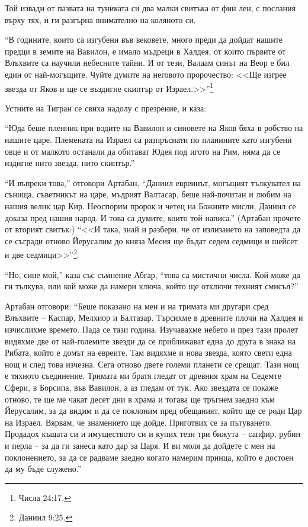 \documentclass[oneside,10pt]{memoir}
\begin{document}
Той извади от пазвата на туниката си два малки свитъка от фин лен, с послания
върху тях, и ги разгърна внимателно на коляното си.

``В годините, които са изгубени във вековете, много преди да дойдат нашите
предци в земите на Вавилон, е имало мъдреци в Халдея, от които първите от
Влъхвите са научили небесните тайни. И от тези, Валаам синът на Веор е бил един
от най-могъщите. Чуйте думите на неговото пророчество: <<Ще изгрее звезда от
Яков и ще се въздигне скиптър от Израел.>>''\footnote{Числа 24:17.}

Устните на Тигран се свиха надолу с презрение, и каза:

``Юда беше пленник при водите на Вавилон и синовете на Яков бяха в робство на
нашите царе. Племената на Израел са разпръснати по планините като изгубени овце
и от малкото останали да обитават Юдея под игото на Рим, няма да се издигне нито
звезда, нито скиптър.''

``И въпреки това,'' отговори Артабан, ``Даниил евреинът, могъщият тълкувател на
сънища, съветникът на царе, мъдрият Валтасар, беше най-почитан и любим на нашия
велик цар Кир. Неоспорим пророк и четец на Божиите мисли, Даниил се доказа пред
нашия народ. И това са думите, които той написа.'' (Артабан прочете от вторият
свитък:) ``<<И така, знай и разбери, че от излизането на заповедта да се съгради
отново Йерусалим до княза Месия ще бъдат седем седмици и шейсет и две
седмици>>''\footnote{Даниил 9:25.}.

``Но, сине мой,'' каза със съмнение Абгар, ``това са мистични числа. Кой може да
ги тълкува, или кой може да намери ключа, който ще отключи техният смисъл?''

Артабан отговори: ``Беше показано на мен и на тримата ми другари сред Влъхвите
-- Каспар, Мелхиор и Балтазар. Търсихме в древните плочи на Халдея и изчислихме
времето. Пада се тази година. Изучавахме небето и през тази пролет видяхме две
от най-големите звезди да се приближават една до друга в знака на Рибата, който
е домът на евреите. Там видяхме и нова звезда, която свети една нощ и след това
изчезна. Сега отново двете големи планети се срещат. Тази нощ е тяхното
съединение. Тримата ми братя гледат от древния храм на Седемте Сфери, в Борсипа,
във Вавилон, а аз гледам от тук. Ако звездата се покаже отново, те ще ме чакат
десет дни в храма и тогава ще тръгнем заедно към Йерусалим, за да видим и да се
поклоним пред обещаният, който ще се роди Цар на Израел. Вярвам, че знамението
ще дойде. Приготвих се за пътуването. Продадох къщата си и имуществото си и
купих тези три бижута -- сапфир, рубин и перла -- за да ги занеса като дар за
Царя. И ви моля да дойдете с мен на поклонението, за да се радваме заедно когато
намерим принца, който е достоен да му бъде служено.''
\end{document}
